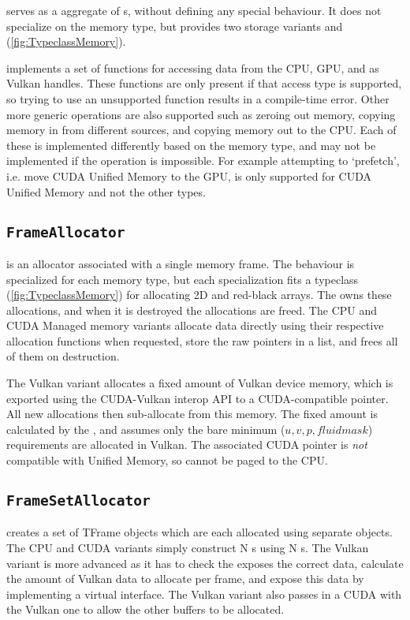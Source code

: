  serves as a aggregate of s, without defining any special behaviour.
It does not specialize on the memory type, but provides two storage variants  and  (\cref{fig:TypeclassMemory}).

 implements a set of functions for accessing data from the CPU, GPU, and as Vulkan handles.
These functions are only present if that access type is supported, so trying to use an unsupported function results in a compile-time error.
Other more generic operations are also supported such as zeroing out memory, copying memory in from different sources, and copying memory out to the CPU.
Each of these is implemented differently based on the memory type, and may not be implemented if the operation is impossible.
For example attempting to `prefetch', i.e. move CUDA Unified Memory to the GPU, is only supported for CUDA Unified Memory and not the other types.

\subsection{\texttt{FrameAllocator}}
 is an allocator associated with a single memory frame.
The behaviour is specialized for each memory type, but each specialization fits a typeclass (\cref{fig:TypeclassMemory}) for allocating 2D and red-black arrays.
The  owns these allocations, and when it is destroyed the allocations are freed.
The CPU and CUDA Managed memory variants allocate data directly using their respective allocation functions when requested, store the raw pointers in a list, and frees all of them on destruction.

The Vulkan variant allocates a fixed amount of Vulkan device memory, which is exported using the CUDA-Vulkan interop API to a CUDA-compatible pointer.
All new allocations then sub-allocate from this memory.
The fixed amount is calculated by the , and assumes only the bare minimum ($u, v, p, fluidmask$) requirements are allocated in Vulkan.
The associated CUDA pointer is \emph{not} compatible with Unified Memory, so cannot be paged to the CPU.

\subsection{\texttt{FrameSetAllocator}}
 creates a set of TFrame objects which are each allocated using separate  objects.
The CPU and CUDA variants simply construct N s using N s.
The Vulkan variant is more advanced as it has to check the  exposes the correct data, calculate the amount of Vulkan data to allocate per frame, and expose this data by implementing a virtual  interface.
The Vulkan variant also passes in a CUDA  with the Vulkan one to allow the other buffers to be allocated.

